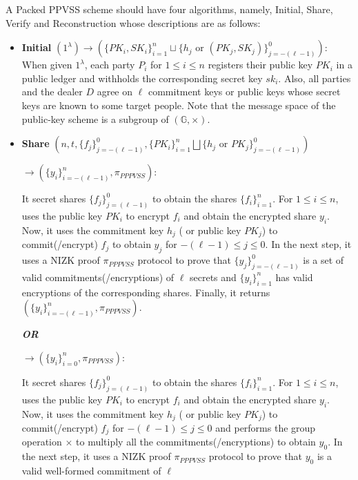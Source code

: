 \begin{definition}
    A Packed PPVSS scheme should have four algorithms, namely, Initial, Share, Verify and Reconstruction whose 
    descriptions are as follows:
    \begin{itemize}
        \item \textbf{Initial} $(1^\lambda)\rightarrow(\{PK_i,SK_i\}_{i=1}^n\sqcup\{h_j\text{ or }(PK_j,SK_j)\}_{j=-(\ell-1)}^0)$: 
          When given $1^\lambda$, each party $P_i$ for $1\leq i\leq n$ registers their public key $PK_i$ in a 
          public ledger and withholds the corresponding secret key $sk_i$. Also, all parties and the dealer $D$ 
          agree on $\ell$ commitment keys or public keys whose secret keys are known to some target people. 
          Note that the message space of the public-key scheme is a subgroup of $(\mathbb{G},\times)$.
        \item \textbf{Share} $(n,t,\{f_j\}_{j=-(\ell-1)}^0,\{PK_i\}_{i=1}^n\bigsqcup\{h_j\text{ or }PK_j\}_{j=-(\ell-1)}^0)$\par
          $\rightarrow(\{y_i\}_{i=-(\ell-1)}^n,\pi_{PPPVSS})$:\par 
          It secret shares $\{f_j\}_{j=(\ell-1)}^0$ to obtain the shares $\{f_i\}_{i=1}^n$. For $1\leq i\leq n$, uses 
          the public key $PK_i$ to encrypt $f_i$ and obtain the encrypted share $y_i$. Now, it uses the commitment 
          key $h_j$ ( or public key $PK_j$) to commit(/encrypt) $f_j$ to obtain $y_j$ for $-(\ell-1)\leq j\leq0$. 
          In the next step, it uses a NIZK proof $\pi_{PPPVSS}$ protocol to prove that $\{y_j\}_{j=-(\ell-1)}^0$ is a set of valid 
          commitments(/encryptions) of $\ell$ secrets and $\{y_i\}_{i=1}^n$ has valid encryptions of the corresponding shares. Finally, it returns $(\{y_i\}_{i=-(\ell-1)}^n,\pi_{PPPVSS})$.\par
          \textit{\textbf{OR}}\par
          $\rightarrow(\{y_i\}_{i=0}^n,\pi_{PPPVSS})$:\par 
          It secret shares $\{f_j\}_{j=(\ell-1)}^0$ to obtain the shares $\{f_i\}_{i=1}^n$. For $1\leq i\leq n$, uses 
          the public key $PK_i$ to encrypt $f_i$ and obtain the encrypted share $y_i$. Now, it uses the commitment 
          key $h_j$ ( or public key $PK_j$) to commit(/encrypt) $f_j$ for $-(\ell-1)\leq j\leq0$ and performs the 
          group operation $\times$ to multiply all the commitments(/encryptions) to obtain $y_0$. 
          In the next step, it uses a NIZK proof $\pi_{PPPVSS}$ protocol to prove that $y_0$ is a valid well-formed commitment of $\ell$ 

\end{itemize}
\end{definition}
